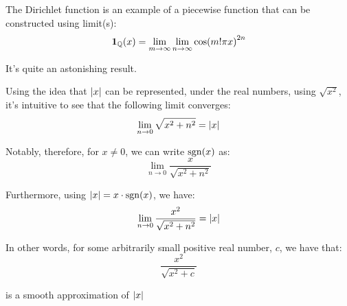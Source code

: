 \begin{theorem}
    The Dirichlet function is an example of a piecewise function that can be constructed using limit(s):
    $$
        \mathbf{1}_{\mathbb{Q}}(x)=\lim_{m\to\infty}{\lim_{n\to\infty}{\cos(m!\pi x)^{2n}}}
    $$

    It's quite an astonishing result.
\end{theorem}

\begin{theorem}
    Using the idea that $\abs{x}$ can be represented, under the real numbers, using $\sqrt{x^2}$, it's intuitive to see that the following limit converges:
    $$
        \lim_{n\to 0}{\sqrt{x^2+n^2}}=\abs{x}
    $$

    Notably, therefore, for $x\neq 0$, we can write $\sgn{x}$ as:
    $$
        \lim_{n\to 0}{\frac{x}{\sqrt{x^2+n^2}}}
    $$

    Furthermore, using $\abs{x}=x\cdot\sgn{x}$, we have:
    $$
        \lim_{n\to 0}{\frac{x^2}{\sqrt{x^2+n^2}}}=\abs{x}
    $$

    In other words, for some arbitrarily small positive real number, $c$, we have that:
    $$
        \frac{x^2}{\sqrt{x^2+c}}
    $$

    is a smooth approximation of $\abs{x}$
\end{theorem}

\newpage